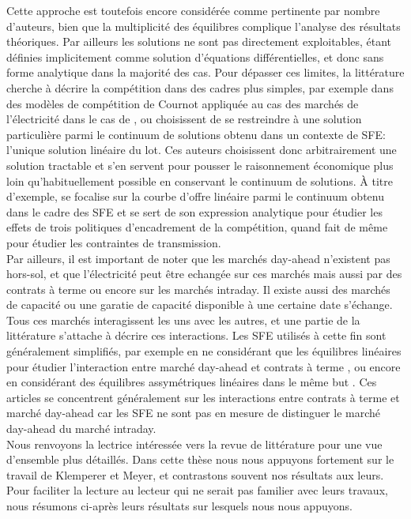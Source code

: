 Cette approche est toutefois encore considérée comme pertinente par nombre d'auteurs, bien que la multiplicité des équilibres complique l'analyse des résultats théoriques. Par ailleurs les solutions ne sont pas directement exploitables, étant définies implicitement comme solution d'équations différentielles, et donc sans forme analytique dans la majorité des cas. Pour dépasser ces limites, la littérature cherche à décrire la compétition dans des cadres plus simples, par exemple dans des modèles de compétition de Cournot appliquée au cas des marchés de l'électricité dans le cas de \cite{borenstein1999empirical}, ou choisissent de se restreindre à une solution particulière parmi le continuum de solutions obtenu dans un contexte de SFE: l'unique solution linéaire du lot. Ces auteurs choisissent donc arbitrairement une solution tractable et s'en servent pour pousser le raisonnement économique plus loin qu'habituellement possible en conservant le continuum de solutions. \`A titre d'exemple, \cite{green1996increasing} se focalise sur la courbe d'offre linéaire parmi le continuum obtenu dans le cadre des SFE et se sert de son expression analytique pour étudier les effets de trois politiques d'encadrement de la compétition, quand \cite{hobbs2000strategic} fait de même pour étudier les contraintes de transmission. \\

Par ailleurs, il est important de noter que les marchés day-ahead n'existent pas hors-sol, et que l'électricité peut être echangée sur ces marchés mais aussi par des contrats à terme ou encore sur les marchés intraday. Il existe aussi des marchés de capacité ou une garatie de capacité disponible à une certaine date s'échange. Tous ces marchés interagissent les uns avec les autres, et une partie de la littérature s'attache à décrire ces interactions. Les SFE utilisés à cette fin sont généralement simplifiés, par exemple en ne considérant que les équilibres linéaires pour étudier l'interaction entre marché day-ahead et contrats à terme \cite{green1999electricity}, ou encore en considérant des équilibres assymétriques linéaires dans le même but \cite{anderson2012asymmetric}. Ces articles se concentrent généralement sur les interactions entre contrats à terme et marché day-ahead car les SFE ne sont pas en mesure de distinguer le marché day-ahead du marché intraday.\\

Nous renvoyons la lectrice intéressée vers la revue de littérature \cite{ventosa2005electricity} pour une vue d'ensemble plus détaillés. Dans cette thèse nous nous appuyons fortement sur le travail de Klemperer et Meyer, et contrastons souvent nos résultats aux leurs. Pour faciliter la lecture au lecteur qui ne serait pas familier avec leurs travaux, nous résumons ci-après leurs résultats sur lesquels nous nous appuyons. 

